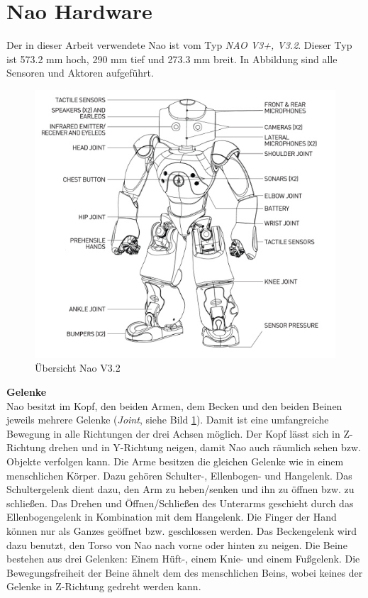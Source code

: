 \section{Nao Hardware}
Der in dieser Arbeit verwendete Nao ist vom Typ \textit{NAO V3+, V3.2}. Dieser Typ ist 573.2 mm hoch, 290 mm tief und 273.3 mm breit. In Abbildung  sind alle Sensoren und Aktoren aufgeführt.
\\
\begin{figure}[H]						
	\centering							
	\includegraphics[scale=0.9]{Bilder/nao_overview.jpg}			
	\caption{Übersicht Nao V3.2}						
	\label{f:nao_ov}						
\end{figure}
\noindent
\textbf{Gelenke}
\\
Nao besitzt  im Kopf, den beiden Armen, dem Becken und den beiden Beinen jeweils mehrere Gelenke (\textit{Joint}, siehe Bild \ref{f:nao_ov}). Damit ist eine umfangreiche Bewegung in alle Richtungen der drei Achsen möglich. Der Kopf lässt sich in Z-Richtung drehen und in Y-Richtung neigen, damit Nao auch räumlich sehen bzw. Objekte verfolgen kann.
Die Arme besitzen die gleichen Gelenke wie in einem menschlichen Körper. Dazu gehören Schulter-, Ellenbogen- und Hangelenk. Das Schultergelenk dient dazu, den Arm zu heben/senken und ihn zu öffnen bzw. zu schließen. Das Drehen und Öffnen/Schließen des Unterarms geschieht durch das Ellenbogengelenk in Kombination mit dem Hangelenk. Die Finger der Hand können nur als Ganzes geöffnet bzw. geschlossen werden.
Das Beckengelenk wird dazu benutzt, den Torso von Nao nach vorne oder hinten zu neigen.
Die Beine bestehen aus drei Gelenken: Einem Hüft-, einem Knie- und einem Fußgelenk. Die Bewegungsfreiheit der Beine ähnelt dem des menschlichen Beins, wobei keines der Gelenke in Z-Richtung gedreht werden kann.

